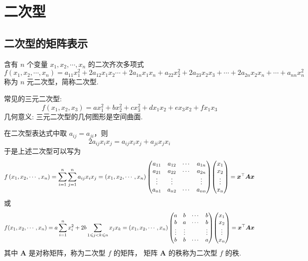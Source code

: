 \section{二次型}

\subsection{二次型的矩阵表示}

\begin{definition}[二次型]
    含有 $ n $ 个变量 $ x_{1}, x_{2}, \cdots, x_{n} $ 的二次齐次多项式
    $$f\left(x_{1}, x_{2}, \cdots, x_{n}\right)=a_{11} x_{1}^{2}+2 a_{12} x_{1} x_{2} \cdots+2 a_{1 n} x_{1} x_{n} +a_{22} x_{2}^{2}+2 a_{23} x_{2} x_{3}+\cdots+2 a_{2 n} x_{2} x_{n} +\cdots+a_{n n} x_{n}^{2}$$
    称为 $ n $ 元二次型，简称二次型.
\end{definition}

常见的三元二次型:
$$f\left(x_{1}, x_{2}, x_{3}\right)= a x_{1}^{2}+b x_{2}^{2}+c x_{3}^{2}+d x_{1} x_{2}+e x_{3} x_{2}+f x_{1} x_{3}$$
几何意义: 三元二次型的几何图形是空间曲面.

\begin{definition}[二次型的矩阵表达]
    在二次型表达式中取 $ a_{i j}=a_{j i} $，则
    $$2 a_{i j} x_{i} x_{j}=a_{i j} x_{i} x_{j}+a_{j i} x_{j} x_{i}$$
    于是上述二次型可以写为
    $$f\left(x_{1}, x_{2}, \cdots, x_{n}\right)=\sum_{i=1}^{n} \sum_{j=1}^{n} a_{i j} x_{i} x_{j}=
        \left(x_{1}, x_{2}, \cdots, x_{n}\right)
        \mqty(a_{11} & a_{12} & \cdots & a_{1 n} \\
        a_{21} & a_{22} & \cdots & a_{2 n} \\
        \vdots & \vdots & & \vdots \\
        a_{n 1} & a_{n 2} & \cdots & a_{n n})
        \mqty(x_{1} \\    x_{2} \\    \vdots \\    x_{n})
        =\boldsymbol{x}^\top \boldsymbol{A} \boldsymbol{x} $$
    或
    $$f(x_1,x_2,\cdots,x_n)=a\sum_{i=1}^{n}x_i^2+2b\sum_{1\leqslant j<k\leqslant n}x_jx_k=
        \left(x_{1}, x_{2}, \cdots, x_{n}\right)
        \mqty(a & b & \cdots & b \\
        b & a & \cdots & b \\
        \vdots & \vdots & & \vdots \\
        b & b & \cdots & a)
        \mqty(x_{1} \\    x_{2} \\    \vdots \\    x_{n})
        =\boldsymbol{x}^\top \boldsymbol{A} \boldsymbol{x}$$
    其中 $ \boldsymbol{A} $ 是对称矩阵，称为二次型 $ f $ 的矩阵，
    矩阵 $ \boldsymbol{A} $ 的秩称为二次型 $ f $ 的秩.
\end{definition}

